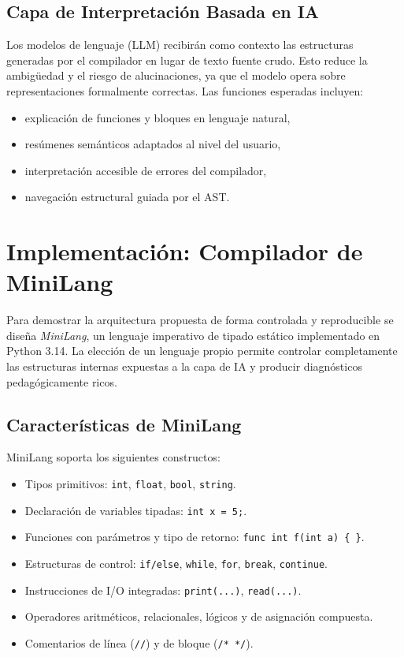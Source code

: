 \documentclass[conference]{IEEEtran}
\begin{document}
\subsection{Capa de Interpretación Basada en IA}

Los modelos de lenguaje (LLM) recibirán como contexto las estructuras generadas por el compilador en lugar de texto fuente crudo. Esto reduce la ambigüedad y el riesgo de alucinaciones, ya que el modelo opera sobre representaciones formalmente correctas. Las funciones esperadas incluyen:

\begin{itemize}
    \item explicación de funciones y bloques en lenguaje natural,
    \item resúmenes semánticos adaptados al nivel del usuario,
    \item interpretación accesible de errores del compilador,
    \item navegación estructural guiada por el AST.
\end{itemize}

\section{Implementación: Compilador de MiniLang}

Para demostrar la arquitectura propuesta de forma controlada y reproducible se diseña \textit{MiniLang}, un lenguaje imperativo de tipado estático implementado en Python 3.14. La elección de un lenguaje propio permite controlar completamente las estructuras internas expuestas a la capa de IA y producir diagnósticos pedagógicamente ricos.

\subsection{Características de MiniLang}

MiniLang soporta los siguientes constructos:

\begin{itemize}
    \item Tipos primitivos: \texttt{int}, \texttt{float}, \texttt{bool}, \texttt{string}.
    \item Declaración de variables tipadas: \texttt{int x = 5;}.
    \item Funciones con parámetros y tipo de retorno: \texttt{func int f(int a)~\{~\}}.
    \item Estructuras de control: \texttt{if/else}, \texttt{while}, \texttt{for}, \texttt{break}, \texttt{continue}.
    \item Instrucciones de I/O integradas: \texttt{print(...)}, \texttt{read(...)}.
    \item Operadores aritméticos, relacionales, lógicos y de asignación compuesta.
    \item Comentarios de línea (\texttt{//}) y de bloque (\texttt{/* */}).
\end{itemize}
\end{document}
